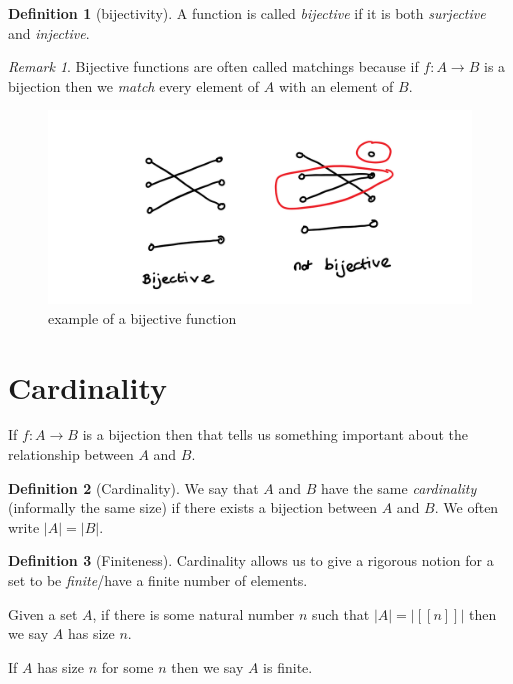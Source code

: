 \documentclass[
]{book}
\theoremstyle{definition}
\newtheorem{definition}{Definition}[chapter]
\theoremstyle{definition}
\theoremstyle{definition}
\theoremstyle{definition}
\theoremstyle{remark}
\newtheorem*{remark}{Remark}
\begin{document}
\begin{definition}[bijectivity]
A function is called \emph{bijective} if it is both \emph{surjective} and \emph{injective}.
\end{definition}

\begin{remark}
Bijective functions are often called matchings because if \(f: A \rightarrow B\) is a bijection then we \emph{match} every element of \(A\) with an element of \(B\).
\end{remark}

\begin{figure}
\centering
\includegraphics{bijective.png}
\caption{\label{fig:unnamed-chunk-4}example of a bijective function}
\end{figure}

\section{Cardinality}\label{cardinality}

If \(f: A \rightarrow B\) is a bijection then that tells us something important about the relationship between \(A\) and \(B\).

\begin{definition}[Cardinality]
We say that \(A\) and \(B\) have the same \emph{cardinality} (informally the same size) if there exists a bijection between \(A\) and \(B\). We often write \(|A| = |B|\).
\end{definition}

\begin{definition}[Finiteness]
Cardinality allows us to give a rigorous notion for a set to be \emph{finite}/have a finite number of elements.

Given a set \(A\), if there is some natural number \(n\) such that \(|A|=|[[n]]|\) then we say \(A\) has size \(n\).

If \(A\) has size \(n\) for some \(n\) then we say \(A\) is finite.
\end{definition}
\end{document}

